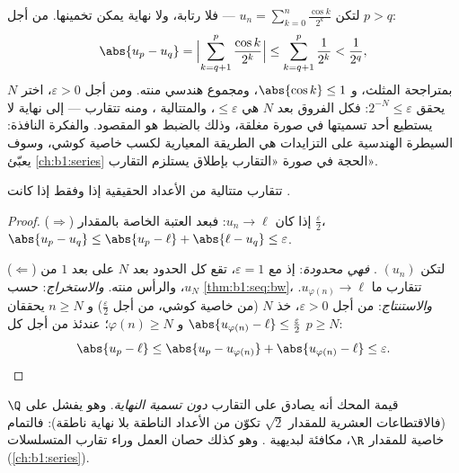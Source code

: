 \begin{example}\label{ex:b1:seq:cauchyhand}
لتكن $u_n = \sum_{k=0}^{n} \frac{\cos k}{2^k}$ --- فلا رتابة،
ولا نهاية يمكن تخمينها. من أجل $p > q$:
\[
\abs{u_p - u_q}
= \Bigl| \sum_{k=q+1}^{p} \frac{\cos k}{2^k} \Bigr|
\leq \sum_{k=q+1}^{p} \frac{1}{2^k}
< \frac{1}{2^{q}} ,
\]
بمتراجحة المثلث، و $\abs{\cos k} \leq 1$، ومجموع
هندسي منته. ومن أجل $\varepsilon > 0$، اختر $N$ يحقق $2^{-N}
\leq \varepsilon$: فكل الفروق بعد $N$ هي $\leq \varepsilon$،
والمتتالية ، ومنه تتقارب --- إلى نهاية لا يستطيع
أحد تسميتها في صورة مغلقة، وذلك بالضبط هو المقصود. والفكرة
النافذة: السيطرة الهندسية على التزايدات هي الطريقة المعيارية
لكسب خاصية كوشي، وسوف يعبّئ \cref{ch:b1:series}
الحجة في صورة «التقارب بإطلاق يستلزم
التقارب».
\end{example}

\begin{theorem}[تمام $\R$]\label{thm:b1:seq:complete}
تتقارب متتالية من الأعداد الحقيقية إذا وفقط إذا كانت .
\end{theorem}

\begin{proof}
($\Rightarrow$) إذا كان $u_n \to \ell$: فبعد العتبة الخاصة بالمقدار
$\frac\varepsilon2$، $\abs{u_p - u_q} \leq \abs{u_p - \ell} +
\abs{\ell - u_q} \leq \varepsilon$.

($\Leftarrow$) لتكن $(u_n)$ . \emph{فهي محدودة}: إذ مع
$\varepsilon = 1$، تقع كل الحدود بعد $N$ على بعد $1$ من $u_N$،
والرأس منته. \emph{والاستخراج}: حسب
\cref{thm:b1:seq:bw}، تتقارب  ما $u_{\varphi(n)} \to \ell$.
\emph{والاستنتاج}: من أجل $\varepsilon > 0$، خذ $N$ (من خاصية كوشي، من أجل
$\frac\varepsilon2$) و $n \geq N$ يحققان $\abs{u_{\varphi(n)} - \ell}
\leq \frac\varepsilon2$ و $\varphi(n) \geq N$؛ عندئذ من أجل كل $p
\geq N$:
\[
\abs{u_p - \ell} \leq \abs{u_p - u_{\varphi(n)}} +
\abs{u_{\varphi(n)} - \ell} \leq \varepsilon . \qedhere
\]
\end{proof}

\begin{remark}
قيمة المحك أنه يصادق على التقارب \emph{دون
تسمية النهاية}. وهو يفشل على $\Q$ (فالاقتطاعات العشرية للمقدار
$\sqrt 2$ تكوّن  من الأعداد الناطقة بلا نهاية ناطقة):
فالتمام خاصية للمقدار $\R$، مكافئة لبديهية . وهو كذلك حصان العمل وراء تقارب
المتسلسلات (\cref{ch:b1:series}).
\end{remark}

